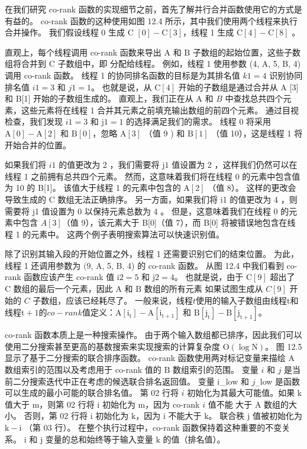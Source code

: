 在我们研究 co-rank 函数的实现细节之前，首先了解并行合并函数使用它的方式是有益的。 co-rank 函数的这种使用如图 12.4 所示，其中我们使用两个线程来执行合并操作。 我们假设线程 0 生成 $\mathrm{C}$ $[0]-\mathrm{C}[3]$，线程 1 生成 $\mathrm{C}[4]-\mathrm{C}[8]$ 。

直观上，每个线程调用 co-rank 函数来导出 $\mathrm{A}$ 和 $\mathrm{B}$ 子数组的起始位置，这些子数组将合并到 $\mathrm{C}$ 子数组中，即 分配给线程。 例如，线程 1 使用参数 (4, A, 5, B, 4) 调用 co-rank 函数。 线程 1 的协同排名函数的目标是为其排名值 $k 1=4$ 识别协同排名值 $i 1=3$ 和 $j 1=1$。 也就是说，从 $\mathrm{C}[4]$ 开始的子数组是通过合并从 $\mathrm{A}$ [3] 和 B[1] 开始的子数组生成的。 直观上，我们正在从 A 和 $B$ 中查找总共四个元素，这些元素将在线程 1 合并其元素之前填充输出数组的前四个元素。 通过目视检查，我们发现 $i 1=3$ 和 $\mathrm{j} 1=1$ 的选择满足我们的需求。 线程 0 将采用 $\mathrm{A}[0]-\mathrm{A}[2]$ 和 $\mathrm{B}[0]$，忽略 $\mathrm{A}[3]$ （值 9 ) 和 $\mathrm{B}[1]$ （值 10），这是线程 1 将开始合并的位置。

如果我们将 $i 1$ 的值更改为 2 ，我们需要将 $\mathrm{j} 1$ 值设置为 2 ，这样我们仍然可以在线程 1 之前拥有总共四个元素。 然而，这意味着我们将在线程 0 的元素中包含值为 10 的 B[1]。 该值大于线程 1 的元素中包含的 $\mathrm{A}[2]$ （值 8）。 这样的更改会导致生成的 $\mathrm{C}$ 数组无法正确排序。 另一方面，如果我们将 i1 的值更改为 4 ，则需要将 j1 值设置为 0 以保持元素总数为 4 。 但是，这意味着我们在线程 0 的元素中包含 $A[3]$（值 9），该元素大于 B[0]（值 7），而 B[0] 将被错误地包含在线程 1 的元素中。 这两个例子表明搜索算法可以快速识别值。

除了识别其输入段的开始位置之外，线程 1 还需要识别它们的结束位置。 为此，线程 1 还调用参数为 $(9$, A, 5, B, 4) 的 co-rank 函数。 从图 12.4 中我们看到 co-rank 函数应该产生 co-rank 值 $\mathrm{i} 2=5$ 和 $\mathrm{j} 2=4$。 也就是说，由于 $\mathrm{C}[9]$ 超出了 $\mathrm{C}$ 数组的最后一个元素，因此 $\mathrm{A}$ 和 $\mathrm{B}$ 数组的所有元素 如果试图生成从 $C[9]$ 开始的 $C$ 子数组，应该已经耗尽了。 一般来说，线程$t$使用的输入子数组由线程$\mathrm{t}$和线程$\mathrm{t}+1的co-rank值定义：\mathrm{A}\left[ \mathrm{i}_{\mathrm{t}}\right]-\mathrm{A}\left[\mathrm{i}_{\mathrm{t}+1}\right]$ 和 $\mathrm{B }\left[\mathrm{j}_{\mathrm{t}}\right]-\mathrm{B}\left[\mathrm{j}_{\mathrm{t}+1}\right]$。

co-rank 函数本质上是一种搜索操作。 由于两个输入数组都已排序，因此我们可以使用二分搜索甚至更高的基数搜索来实现搜索的计算复杂度 $\mathrm{O}(\log \mathrm{N})$。 图 12.5 显示了基于二分搜索的联合排序函数。 co-rank 函数使用两对标记变量来描绘 $\mathrm{A}$ 数组索引的范围以及考虑用于 co-rank 值的 $\mathrm{B}$ 数组索引的范围。 变量 $i$ 和 $j$ 是当前二分搜索迭代中正在考虑的候选联合排名返回值。 变量 i\_low 和 $j_{-}$low 是函数可以生成的最小可能的联合排名值。 第 02 行将 $i$ 初始化为其最大可能值。如果 $\mathrm{k}$ 值大于 $\mathrm{m}$，则第 02 行将 $\mathrm{i}$ 初始化为 $\mathrm{m}$，因为 co-rank $i$ 值不能 大于 A 数组的大小。 否则，第 02 行将 $\mathrm{i}$ 初始化为 $\mathrm{k}$，因为 $\mathrm{i}$ 不能大于 $\mathrm{k}$。 联合秩 $\mathrm{j}$ 值被初始化为 $\mathrm{k}-\mathrm{i}$ （第 03 行）。 在整个执行过程中，co-rank 函数保持着这种重要的不变关系。 $\mathrm{i}$ 和 $\mathrm{j}$ 变量的总和始终等于输入变量 $\mathrm{k}$ 的值（排名值）。

